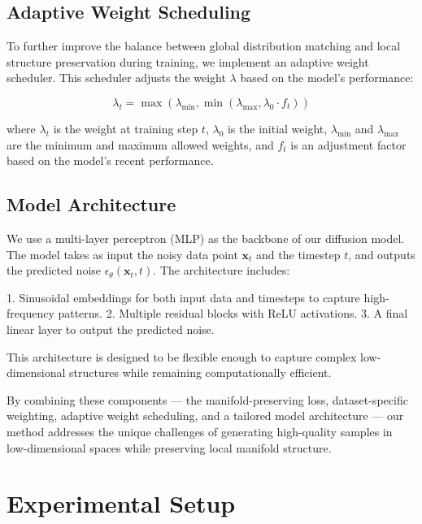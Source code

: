 \documentclass{article} %
\begin{document}
\subsection{Adaptive Weight Scheduling}

To further improve the balance between global distribution matching and local structure preservation during training, we implement an adaptive weight scheduler. This scheduler adjusts the weight $\lambda$ based on the model's performance:

\begin{equation}
\lambda_t = \max(\lambda_\text{min}, \min(\lambda_\text{max}, \lambda_0 \cdot f_t))
\end{equation}

where $\lambda_t$ is the weight at training step $t$, $\lambda_0$ is the initial weight, $\lambda_\text{min}$ and $\lambda_\text{max}$ are the minimum and maximum allowed weights, and $f_t$ is an adjustment factor based on the model's recent performance.

\subsection{Model Architecture}

We use a multi-layer perceptron (MLP) as the backbone of our diffusion model. The model takes as input the noisy data point $\mathbf{x}_t$ and the timestep $t$, and outputs the predicted noise $\epsilon_\theta(\mathbf{x}_t, t)$. The architecture includes:

1. Sinusoidal embeddings for both input data and timesteps to capture high-frequency patterns.
2. Multiple residual blocks with ReLU activations.
3. A final linear layer to output the predicted noise.

This architecture is designed to be flexible enough to capture complex low-dimensional structures while remaining computationally efficient.

By combining these components --- the manifold-preserving loss, dataset-specific weighting, adaptive weight scheduling, and a tailored model architecture --- our method addresses the unique challenges of generating high-quality samples in low-dimensional spaces while preserving local manifold structure.

\section{Experimental Setup}
\label{sec:experimental}
\end{document}

